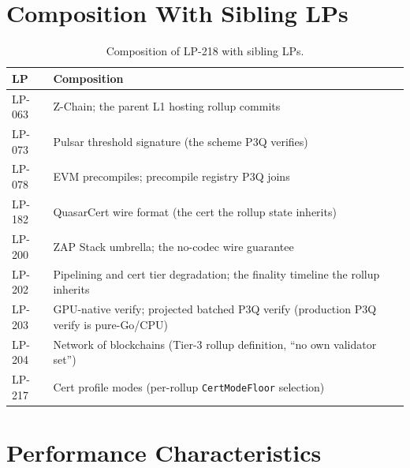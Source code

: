 \section{Composition With Sibling LPs}

\begin{table}[h]
\centering
\small
\begin{tabular}{@{}lp{9cm}@{}}
\toprule
\textbf{LP} & \textbf{Composition} \\
\midrule
LP-063 & Z-Chain; the parent L1 hosting rollup commits \\
LP-073 & Pulsar threshold signature (the scheme P3Q verifies) \\
LP-078 & EVM precompiles; precompile registry P3Q joins \\
LP-182 & QuasarCert wire format (the cert the rollup state inherits) \\
LP-200 & ZAP Stack umbrella; the no-codec wire guarantee \\
LP-202 & Pipelining and cert tier degradation; the finality timeline the rollup inherits \\
LP-203 & GPU-native verify; projected batched P3Q verify (production P3Q verify is pure-Go/CPU) \\
LP-204 & Network of blockchains (Tier-3 rollup definition, ``no own validator set'') \\
LP-217 & Cert profile modes (per-rollup \texttt{CertModeFloor} selection) \\
\bottomrule
\end{tabular}
\caption{Composition of LP-218 with sibling LPs.}
\label{tab:composition}
\end{table}

\section{Performance Characteristics}

